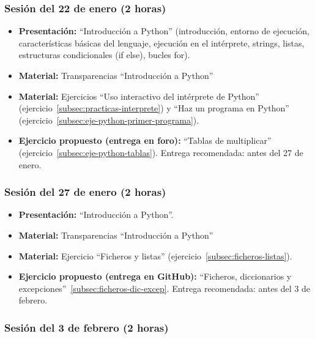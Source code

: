 \documentclass[a4paper,12pt]{article}
\begin{document}
\subsubsection{Sesión del 22 de enero (2 horas)}

\begin{itemize}
\item \textbf{Presentación:} ``Introducción a Python'' (introducción, entorno de ejecución, características básicas del lenguaje, ejecución en el intérprete, strings, listas, estructuras condicionales (if else), bucles for).
\item \textbf{Material:} Transparencias ``Introducción a Python''
\item \textbf{Material:} Ejercicios ``Uso interactivo del intérprete de Python'' (ejercicio~\ref{subsec:practicas-interprete}) y ``Haz un programa en Python'' (ejercicio~\ref{subsec:eje-python-primer-programa}).
\item \textbf{Ejercicio propuesto (entrega en foro):} ``Tablas de multiplicar'' (ejercicio~\ref{subsec:eje-python-tablas}).
   Entrega recomendada: antes del 27 de enero.
\end{itemize}

\subsubsection{Sesión del 27 de enero (2 horas)}

\begin{itemize}
\item \textbf{Presentación:} ``Introducción a Python''.
\item \textbf{Material:} Transparencias ``Introducción a Python''
\item \textbf{Material:} Ejercicio ``Ficheros y listas'' (ejercicio~\ref{subsec:ficheros-listas}).
\item \textbf{Ejercicio propuesto (entrega en GitHub):} ``Ficheros, diccionarios y excepciones''~\ref{subsec:ficheros-dic-excep}.
   Entrega recomendada: antes del 3 de febrero.
\end{itemize}

\subsubsection{Sesión del 3 de febrero (2 horas)}
\end{document}
